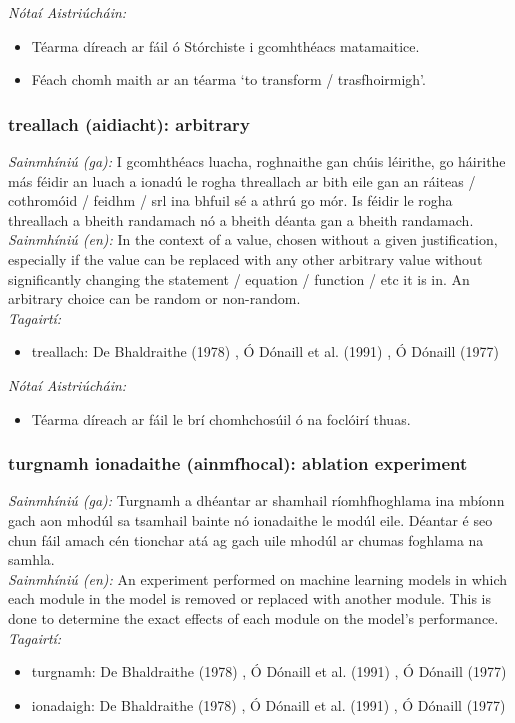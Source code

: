 \documentclass{article}
\begin{document}
 \noindent \textit{Nótaí Aistriúcháin:}
\begin{itemize}
	\item Téarma díreach ar fáil ó Stórchiste i gcomhthéacs matamaitice.
	\item Féach chomh maith ar an téarma `to transform / trasfhoirmigh'.
\end{itemize}


\subsubsection*{treallach (aidiacht): arbitrary}
 \noindent \textit{Sainmhíniú (ga):} I gcomhthéacs luacha, roghnaithe gan chúis léirithe, go háirithe más féidir an luach a ionadú le rogha threallach ar bith eile gan an ráiteas / cothromóid / feidhm / srl ina bhfuil sé a athrú go mór. Is féidir le rogha threallach a bheith randamach nó a bheith déanta gan a bheith randamach.
\\
 \noindent \textit{Sainmhíniú (en):} In the context of a value, chosen without a given justification, especially if the value can be replaced with any other arbitrary value without significantly changing the statement / equation / function / etc it is in. An arbitrary choice can be random or non-random.
\\
 \noindent \textit{Tagairtí:}
\begin{itemize}
	\item treallach: De Bhaldraithe (1978) \cite{de-bhaldraithe}, Ó Dónaill et al. (1991) \cite{focloir-beag}, Ó Dónaill (1977) \cite{odonaill}
\end{itemize}

 \noindent \textit{Nótaí Aistriúcháin:}
\begin{itemize}
	\item Téarma díreach ar fáil le brí chomhchosúil ó na foclóirí thuas.
\end{itemize}


\subsubsection*{turgnamh ionadaithe (ainmfhocal): ablation experiment}
 \noindent \textit{Sainmhíniú (ga):} Turgnamh a dhéantar ar shamhail ríomhfhoghlama ina mbíonn gach aon mhodúl sa tsamhail bainte nó ionadaithe le modúl eile. Déantar é seo chun fáil amach cén tionchar atá ag gach uile mhodúl ar chumas foghlama na samhla.
\\
 \noindent \textit{Sainmhíniú (en):} An experiment performed on machine learning models in which each module in the model is removed or replaced with another module. This is done to determine the exact effects of each module on the model's performance.
\\
 \noindent \textit{Tagairtí:}
\begin{itemize}
	\item turgnamh: De Bhaldraithe (1978) \cite{de-bhaldraithe}, Ó Dónaill et al. (1991) \cite{focloir-beag}, Ó Dónaill (1977) \cite{odonaill}
	\item ionadaigh: De Bhaldraithe (1978) \cite{de-bhaldraithe}, Ó Dónaill et al. (1991) \cite{focloir-beag}, Ó Dónaill (1977) \cite{odonaill}
\end{itemize}
\end{document}

